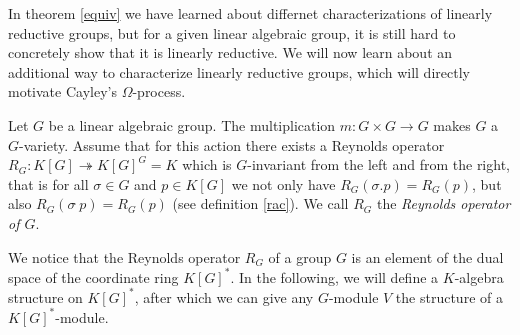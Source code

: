 In theorem \ref{equiv} we have learned about differnet characterizations of linearly reductive groups, but for a given linear algebraic group, it is still hard to concretely show that it is linearly reductive.
We will now learn about an additional way to characterize linearly reductive groups, which will directly motivate Cayley's $\Omega$-process.

\begin{definition}\label{rengr}
  Let $G$ be a linear algebraic group.
  The multiplication $m \colon G\times G \rightarrow G$ makes $G$ a $G$-variety.
  Assume that for this action there exists a Reynolds operator $R_G \colon K[G] \twoheadrightarrow K[G]^G = K$ which is $G$-invariant from the left and from the right, that is for all $\sigma \in G$ and $p \in K[G]$ we not only have $R_G(\sigma.p)=R_G(p)$, but also $R_G(\sigma\dot{\phantom{.}}p)=R_G(p)$ (see definition \ref{rac}).
  We call $R_G$ the \textit{Reynolds operator of $G$}.
\end{definition}

We notice that the Reynolds operator $R_G$ of a group $G$ is an element of the dual space of the coordinate ring $K[G]^\ast$.
In the following, we will define a $K$-algebra structure on $K[G]^\ast$, after which we can give any $G$-module $V$ the structure of a $K[G]^\ast$-module.



